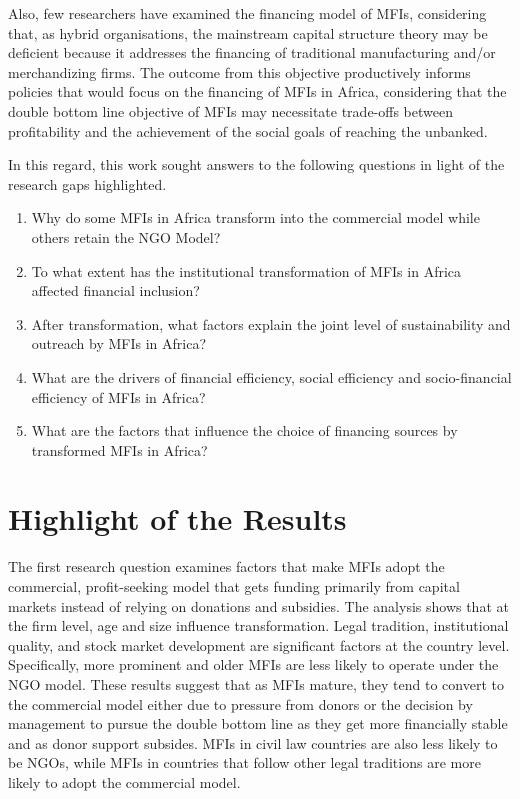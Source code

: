 \documentclass[a4paper, nobind]{templates/ociamthesis}
\begin{document}
Also, few researchers have examined the financing model of MFIs, considering that, as hybrid organisations, the mainstream capital structure theory may be deficient because it addresses the financing of traditional manufacturing and/or merchandizing firms. The outcome from this objective productively informs policies that would focus on the financing of MFIs in Africa, considering that the double bottom line objective of MFIs may necessitate trade-offs between profitability and the achievement of the social goals of reaching the unbanked.

In this regard, this work sought answers to the following questions in light of the research gaps highlighted.

\begin{enumerate}
\def\labelenumi{\arabic{enumi}.}
\item
  Why do some MFIs in Africa transform into the commercial model while others retain the NGO Model?
\item
  To what extent has the institutional transformation of MFIs in Africa affected financial inclusion?
\item
  After transformation, what factors explain the joint level of sustainability and outreach by MFIs in Africa?
\item
  What are the drivers of financial efficiency, social efficiency and socio-financial efficiency of MFIs in Africa?
\item
  What are the factors that influence the choice of financing sources by transformed MFIs in Africa?
\end{enumerate}

\hypertarget{highlight-of-the-results}{%
\section{Highlight of the Results}\label{highlight-of-the-results}}

The first research question examines factors that make MFIs adopt the commercial, profit-seeking model that gets funding primarily from capital markets instead of relying on donations and subsidies. The analysis shows that at the firm level, age and size influence transformation. Legal tradition, institutional quality, and stock market development are significant factors at the country level. Specifically, more prominent and older MFIs are less likely to operate under the NGO model. These results suggest that as MFIs mature, they tend to convert to the commercial model either due to pressure from donors or the decision by management to pursue the double bottom line as they get more financially stable and as donor support subsides. MFIs in civil law countries are also less likely to be NGOs, while MFIs in countries that follow other legal traditions are more likely to adopt the commercial model.
\end{document}

